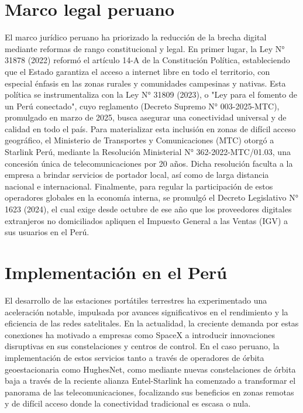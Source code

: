 \section{Marco legal peruano}

El marco jurídico peruano ha priorizado la reducción de la brecha digital mediante reformas de rango constitucional y legal. 
En primer lugar, la Ley N° 31878 (2022) reformó el artículo 14-A de la Constitución Política, estableciendo que el Estado garantiza el acceso a internet libre en todo el territorio, con especial énfasis en las zonas rurales y comunidades campesinas y nativas. 
Esta política se instrumentaliza con la Ley N° 31809 (2023), o "Ley para el fomento de un Perú conectado", cuyo reglamento (Decreto Supremo N° 003-2025-MTC), promulgado en marzo de 2025, busca asegurar una conectividad universal y de calidad en todo el país.
Para materializar esta inclusión en zonas de difícil acceso geográfico, el Ministerio de Transportes y Comunicaciones (MTC) otorgó a Starlink Perú, mediante la Resolución Ministerial N° 362-2022-MTC/01.03, una concesión única de telecomunicaciones por 20 años. 
Dicha resolución faculta a la empresa a brindar servicios de portador local, así como de larga distancia nacional e internacional. 
Finalmente, para regular la participación de estos operadores globales en la economía interna, se promulgó el Decreto Legislativo N° 1623 (2024), el cual exige desde octubre de ese año que los proveedores digitales extranjeros no domiciliados apliquen el Impuesto General a las Ventas (IGV) a sus usuarios en el Perú.


\section{Implementación en el Perú}

El desarrollo de las estaciones portátiles terrestres ha experimentado una aceleración notable, impulsada por avances significativos en el rendimiento y la eficiencia de las redes satelitales. 
En la actualidad, la creciente demanda por estas conexiones ha motivado a empresas como SpaceX a introducir innovaciones disruptivas en sus constelaciones y centros de control. 
En el caso peruano, la implementación de estos servicios tanto a través de operadores de órbita geoestacionaria como HughesNet, como mediante nuevas constelaciones de órbita baja a través de la 
reciente alianza Entel-Starlink ha comenzado a transformar el panorama de las telecomunicaciones, focalizando sus beneficios en zonas remotas y de difícil acceso donde la conectividad tradicional es escasa o nula.

